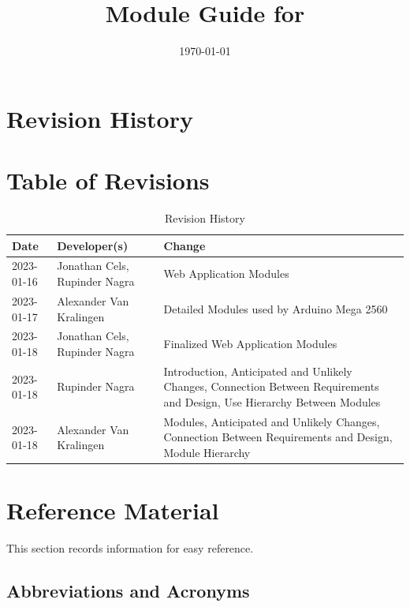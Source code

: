 \documentclass[12pt, titlepage]{article}
\begin{document}
\title{Module Guide for \progname{}} 
\author{\authname}
\date{\today}

\maketitle


\section{Revision History}

\section*{Table of Revisions}
\begin{table}[hp]
\caption{Revision History} \label{TblRevisionHistory}
\begin{tabularx}{\textwidth}{llX}
\toprule
\textbf{Date} & \textbf{Developer(s)} & \textbf{Change}\\
\midrule
2023-01-16 & Jonathan Cels, Rupinder Nagra & Web Application Modules\\
2023-01-17 & Alexander Van Kralingen & Detailed Modules used by Arduino Mega 2560\\
2023-01-18 & Jonathan Cels, Rupinder Nagra & Finalized Web Application Modules\\
2023-01-18 & Rupinder Nagra & Introduction, Anticipated and Unlikely Changes, Connection Between Requirements and Design, Use Hierarchy Between Modules\\
2023-01-18 & Alexander Van Kralingen & Modules, Anticipated and Unlikely Changes, Connection Between Requirements and Design, Module Hierarchy\\
\bottomrule
\end{tabularx}
\end{table}

\newpage

\section{Reference Material}

This section records information for easy reference.

\subsection{Abbreviations and Acronyms}
\end{document}
